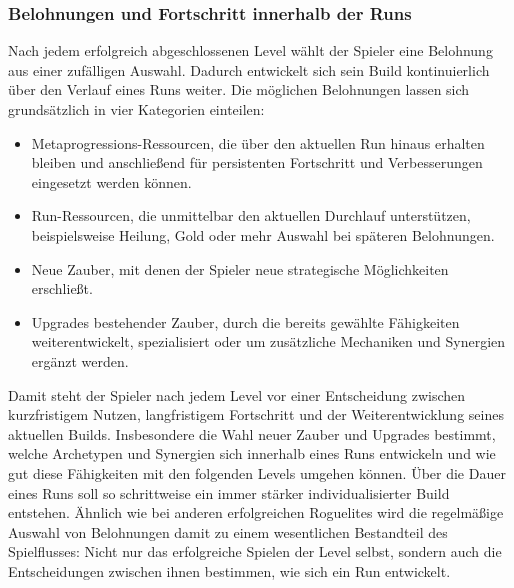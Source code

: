 \subsubsection{Belohnungen und Fortschritt innerhalb der Runs}
Nach jedem erfolgreich abgeschlossenen Level wählt der Spieler eine Belohnung aus einer zufälligen Auswahl.
Dadurch entwickelt sich sein Build kontinuierlich über den Verlauf eines Runs weiter.
Die möglichen Belohnungen lassen sich grundsätzlich in vier Kategorien einteilen:
\begin{itemize}
    \item Metaprogressions-Ressourcen, die über den aktuellen Run hinaus erhalten bleiben und anschließend für persistenten Fortschritt und Verbesserungen eingesetzt werden können.
    \item Run-Ressourcen, die unmittelbar den aktuellen Durchlauf unterstützen, beispielsweise Heilung, Gold oder mehr Auswahl bei späteren Belohnungen.
    \item Neue Zauber, mit denen der Spieler neue strategische Möglichkeiten erschließt.
    \item Upgrades bestehender Zauber, durch die bereits gewählte Fähigkeiten weiterentwickelt, spezialisiert oder um zusätzliche Mechaniken und Synergien ergänzt werden.
\end{itemize}

Damit steht der Spieler nach jedem Level vor einer Entscheidung zwischen kurzfristigem Nutzen, langfristigem Fortschritt und der Weiterentwicklung seines aktuellen Builds.
Insbesondere die Wahl neuer Zauber und Upgrades bestimmt, welche Archetypen und Synergien sich innerhalb eines Runs entwickeln und wie gut diese Fähigkeiten mit den folgenden Levels umgehen können.
Über die Dauer eines Runs soll so schrittweise ein immer stärker individualisierter Build entstehen.
Ähnlich wie bei anderen erfolgreichen Roguelites wird die regelmäßige Auswahl von Belohnungen damit zu einem wesentlichen Bestandteil des Spielflusses:
Nicht nur das erfolgreiche Spielen der Level selbst, sondern auch die Entscheidungen zwischen ihnen bestimmen, wie sich ein Run entwickelt.

